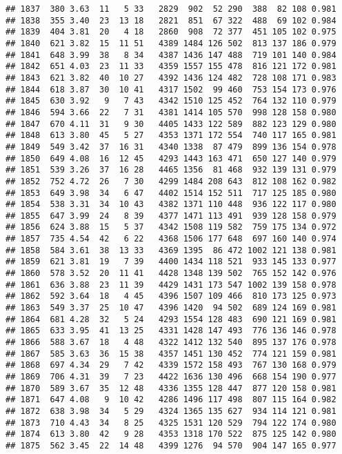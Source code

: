 \documentclass[]{article}
\begin{document}
\begin{verbatim}
## 1837  380 3.63  11   5 33   2829  902  52 290  388  82 108 0.981
## 1838  355 3.40  23  13 18   2821  851  67 322  488  69 102 0.984
## 1839  404 3.81  20   4 18   2860  908  72 377  451 105 102 0.975
## 1840  621 3.82  15  11 51   4389 1484 126 502  813 137 186 0.979
## 1841  648 3.99  38   8 34   4387 1436 147 488  719 101 140 0.984
## 1842  651 4.03  23  11 33   4359 1557 155 478  816 121 172 0.981
## 1843  621 3.82  40  10 27   4392 1436 124 482  728 108 171 0.983
## 1844  618 3.87  30  10 41   4317 1502  99 460  753 154 173 0.976
## 1845  630 3.92   9   7 43   4342 1510 125 452  764 132 110 0.979
## 1846  594 3.66  22   7 31   4381 1414 105 570  998 128 158 0.980
## 1847  670 4.11  31   9 30   4405 1433 122 589  882 123 129 0.980
## 1848  613 3.80  45   5 27   4353 1371 172 554  740 117 165 0.981
## 1849  549 3.42  37  16 31   4340 1338  87 479  899 136 154 0.978
## 1850  649 4.08  16  12 45   4293 1443 163 471  650 127 140 0.979
## 1851  539 3.26  37  16 28   4465 1356  81 468  932 139 131 0.979
## 1852  752 4.72  26   7 30   4299 1484 208 643  812 108 162 0.982
## 1853  649 3.98  34   6 47   4402 1514 152 511  717 125 185 0.980
## 1854  538 3.31  34  10 43   4382 1371 110 448  936 122 117 0.980
## 1855  647 3.99  24   8 39   4377 1471 113 491  939 128 158 0.979
## 1856  624 3.88  15   5 37   4342 1508 119 582  759 175 134 0.972
## 1857  735 4.54  42   6 22   4368 1506 177 648  697 160 140 0.974
## 1858  584 3.61  38  13 33   4369 1395  86 472 1002 121 138 0.981
## 1859  621 3.81  19   7 39   4400 1434 118 521  933 145 133 0.977
## 1860  578 3.52  20  11 41   4428 1348 139 502  765 152 142 0.976
## 1861  636 3.88  23  11 39   4429 1431 173 547 1002 139 158 0.978
## 1862  592 3.64  18   4 45   4396 1507 109 466  810 173 125 0.973
## 1863  549 3.37  25  10 47   4396 1420  94 502  689 124 169 0.981
## 1864  681 4.28  32   5 24   4293 1554 128 483  690 121 169 0.981
## 1865  633 3.95  41  13 25   4331 1428 147 493  776 136 146 0.978
## 1866  588 3.67  18   4 48   4322 1412 132 540  895 137 176 0.978
## 1867  585 3.63  36  15 38   4357 1451 130 452  774 121 159 0.981
## 1868  697 4.34  29   7 42   4339 1572 158 493  767 130 168 0.979
## 1869  706 4.31  39   7 23   4422 1636 130 496  668 154 190 0.977
## 1870  589 3.67  35  12 48   4336 1355 128 447  877 120 158 0.981
## 1871  647 4.08   9  10 42   4286 1496 117 498  807 115 164 0.982
## 1872  638 3.98  34   5 29   4324 1365 135 627  934 114 121 0.981
## 1873  710 4.43  34   8 25   4325 1531 120 529  794 122 174 0.980
## 1874  613 3.80  42   9 28   4353 1318 170 522  875 125 142 0.980
## 1875  562 3.45  22  14 48   4399 1276  94 570  904 147 165 0.977

\end{verbatim}
\end{document}
